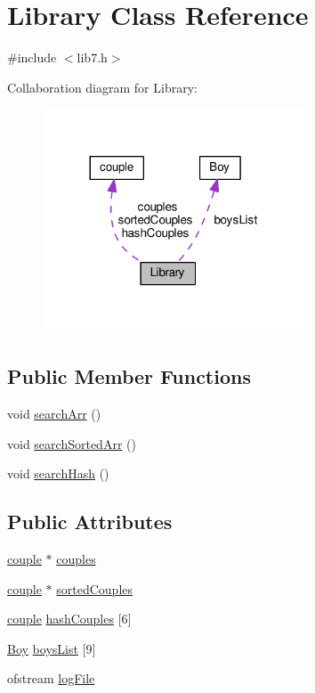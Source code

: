 \hypertarget{classLibrary}{}\section{Library Class Reference}
\label{classLibrary}


{\ttfamily \#include $<$lib7.\+h$>$}



Collaboration diagram for Library\+:
\nopagebreak
\begin{figure}[H]
\begin{center}
\leavevmode
\includegraphics[width=221pt]{classLibrary__coll__graph}
\end{center}
\end{figure}
\subsection*{Public Member Functions}
\begin{DoxyCompactItemize}
\item 
void \hyperlink{classLibrary_af9853cceb7af37b77091c3330b532b2f}{search\+Arr} ()
\item 
void \hyperlink{classLibrary_a835ea2c0b31c569aac4a406843c55254}{search\+Sorted\+Arr} ()
\item 
void \hyperlink{classLibrary_ad14b4301aa6279c13408ff948ca4fd6a}{search\+Hash} ()
\end{DoxyCompactItemize}
\subsection*{Public Attributes}
\begin{DoxyCompactItemize}
\item 
\hyperlink{classcouple}{couple} $\ast$ \hyperlink{classLibrary_a6c32f4296982c3281d61d12b1add0ede}{couples}
\item 
\hyperlink{classcouple}{couple} $\ast$ \hyperlink{classLibrary_a30e860e047d63ab63b40ac42e9660f25}{sorted\+Couples}
\item 
\hyperlink{classcouple}{couple} \hyperlink{classLibrary_ac6f3af3c59edb37adb8d0becda498b42}{hash\+Couples} \mbox{[}6\mbox{]}
\item 
\hyperlink{classBoy}{Boy} \hyperlink{classLibrary_a0da9d216b9e07af39f5f0f3241a0a45c}{boys\+List} \mbox{[}9\mbox{]}
\item 
ofstream \hyperlink{classLibrary_ad8fbb4e17a98e57b3cffe8257710045d}{log\+File}
\end{DoxyCompactItemize}


